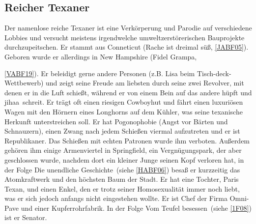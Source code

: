 {\subsection{Reicher Texaner}\label{ReicherTexaner}
Der namenlose reiche Texaner ist eine Verkörperung und Parodie auf verschiedene Lobbies und versucht meistens irgendwelche umweltzerstörerischen Bauprojekte durchzupeitschen. Er stammt aus Conneticut (\glqq Rache ist dreimal süß\grqq , \ref{JABF05}). Geboren wurde er allerdings in New Hampshire (\glqq Fidel Grampa\grqq, }\ref{VABF19}). Er beleidigt gerne andere Personen (z.B. Lisa beim Tisch-deck-Wettbewerb) und zeigt seine Freude am liebsten durch seine zwei Revolver, mit denen er in die Luft schießt, während er von einem Bein auf das andere hüpft und \glqq jihaa\grqq\ schreit. Er trägt oft einen riesigen Cowboyhut und fährt einen luxuriösen Wagen mit den Hörnern eines Longhorns auf dem Kühler, was seine texanische Herkunft unterstreichen soll. Er hat Pogonophobie (Angst vor Bärten und Schnauzern), einen Zwang nach jedem Schießen viermal aufzutreten und er ist Republikaner. Das Schießen mit echten Patronen wurde ihm verboten. Außerdem gehören ihm einige Armenviertel in Springfield, ein Vergnügungspark, der aber geschlossen wurde, nachdem dort ein kleiner Junge seinen Kopf verloren hat, in der Folge \glqq Die unendliche Geschichte\grqq\ (siehe \ref{HABF06}) besaß er kurzzeitig das Atomkraftwerk und den höchsten Baum der Stadt. Er hat eine Tochter, Paris Texan, und einen Enkel, den er trotz seiner Homosexualität immer noch liebt, was er sich jedoch anfangs nicht eingestehen wollte. Er ist Chef der Firma Omni-Pave und einer Kupferrohrfabrik. In der Folge \glqq Vom Teufel besessen\grqq\ (siehe \ref{1F08}) ist er Senator.


